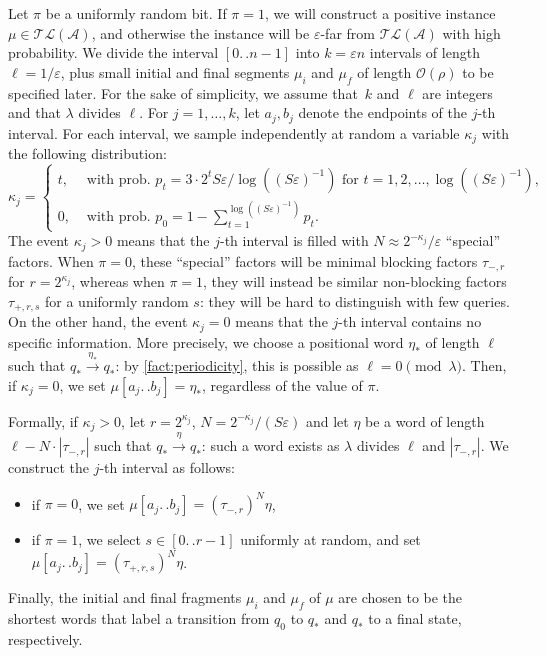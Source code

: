 \documentclass[letterpaper, USenglish, cleveref, autoref, thm-restate, numberwithinsect]{lipics-v2021}
\theoremstyle{theorem}
\theoremstyle{definition}
\newcommand{\Aa}{\mathcal{A}}
\newcommand{\cO}{\mathcal{O}}
\newcommand{\dd}{.\,.}
\newcommand{\eps}{\varepsilon}
\newcommand{\timedlang}[1]{\mathcal{TL}( #1 )}
\begin{document}
Let $\pi$ be a uniformly random bit. If $\pi = 1$, we will construct a positive instance $\mu \in \timedlang{\Aa}$, and otherwise the instance will be $\eps$-far from $\timedlang{\Aa}$ with high probability.
We divide the interval $[0 \dd n-1]$ into $k = \eps n$ intervals of length $\ell = 1/\eps$, plus small initial and final segments $\mu_i$ and $\mu_f$ of length $\cO(\rho)$ to be specified later.
For the sake of simplicity, we assume that~$k$ and $\ell$ are integers and that $\lambda$ divides $\ell$.
For $j=1,\ldots, k$, let $a_j, b_j$ denote the endpoints of the $j$-th interval.
For each interval, we sample independently at random a variable $\kappa_j$ with the following distribution:
\begin{equation}
    \kappa_j = \begin{cases}
        t, &\text{ with prob. } p_t = 3\cdot 2^t S\eps/\log(( S\eps)^{-1}) \text{ for } t = 1,2,\ldots, \log(( S\eps)^{-1}),\\
        0,&\text{ with prob. } p_0 = 1 - \sum_{t=1}^{{\log(( S\eps)^{-1})}} p_t.
    \end{cases} 
\end{equation}
The event $\kappa_j > 0$ means that the $j$-th interval is filled with $N \approx 2^{-\kappa_j}/\eps$ ``special'' factors.
When $\pi = 0$, these ``special'' factors will be minimal blocking factors $\tau_{-, r}$ for $r = 2^{\kappa_j}$, whereas when $\pi = 1$, they will instead be similar non-blocking factors $\tau_{+, r, s}$ for a uniformly random $s$: they will be hard to distinguish with few queries.
On the other hand, the event $\kappa_j = 0$ means that the $j$-th interval contains no specific information.
More precisely, we choose a positional word $\eta_*$ of length $\ell$ such that $q_* \xrightarrow{\eta_*} q_*$: by \cref{fact:periodicity}, this is possible as $\ell = 0 \pmod\lambda$. Then, if $\kappa_j = 0$, we set $\mu[a_j\dd b_j] = \eta_*$, regardless of the value of $\pi$.

Formally, if $\kappa_j > 0$, let $r = 2^{\kappa_j}$, $N = 2^{-\kappa_j}/( S\eps)$
and let $\eta$ be a word of length $\ell - N\cdot |\tau_{-,r}|$ such that $q_* \xrightarrow{\eta} q_*$: such a word exists as $\lambda$ divides $\ell$ and $|\tau_{-,r}|$.
We construct the $j$-th interval as follows:
\begin{itemize}
     \item if $\pi = 0$, we set $\mu[a_j\dd b_j] = (\tau_{-,r})^N\eta$,
     \item if $\pi = 1$, we select $s\in [0\dd  r-1]$ uniformly at random, and set $\mu[a_j\dd b_j] = (\tau_{+,r,s})^N\eta$.
\end{itemize}
Finally, the initial and final fragments $\mu_i$ and $\mu_f$ of $\mu$ are chosen to be the shortest words that label a transition from $q_0$ to $q_*$ and $q_*$ to a final state, respectively.
\end{document}
